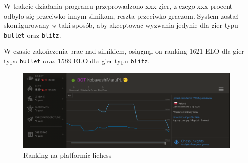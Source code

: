 
W trakcie działania programu przeprowadzono xxx gier, z czego xxx procent odbyło się przeciwko innym silnikom, reszta przeciwko graczom.
System został skonfigurowany w taki sposób, aby akceptować wyzwania jedynie dla gier typu \texttt{bullet} oraz \texttt{blitz}.

W czasie zakończenia prac nad silnikiem, osiągnąl on ranking 1621 ELO dla gier typu \texttt{bullet} oraz 1589 ELO dla gier typu \texttt{blitz}.

\begin{figure}[ht]
    \centering
    \includegraphics[width=1\linewidth]{rozdzialy/rozdzial03/2_porownanie-z-innymi-silnikami/rysunki/lichess-ranking}
    \caption{Ranking na platformie lichess}
    \label{fig:lichess-ranking}
\end{figure}